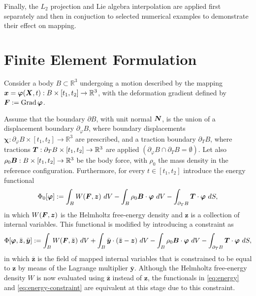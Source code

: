\documentclass[12pt]{article}
\newcommand{\mbs}[1]{\boldsymbol{#1}}
\newcommand{\mbb}[1]{\mathbb{#1}}
\def\by{{\mbs{y}}} \def\bz{{\mbs{z}}}
\def\bvarphi{{\mbs{\varphi}}}
\def\bchi{{\mbs{\chi}}}
\DeclareMathOperator{\Grad}{Grad}
\begin{document}
Finally, the $L_2$ projection and Lie algebra interpolation are applied first
separately and then in conjuction to selected numerical examples to demonstrate
their effect on mapping.


\section{Finite Element Formulation}
\label{sec:FE-formulation}

Consider a body $B\subset\mbb{R}^3$ undergoing a motion described by
the mapping $\bx = \bvarphi(\bX, t): B\times[t_1, t_2]\rightarrow
\mbb{R}^3$, with the deformation gradient defined by $\bF := \Grad
\bvarphi$.

Assume that the boundary $\partial B$, with unit normal $\bN$, is the
union of a displacement boundary $\partial_{\varphi} B$, where
boundary displacements $\bchi : \partial_{\varphi} B\times[t_1,
t_2]\rightarrow \mbb{R}^3$ are prescribed, and a traction boundary
$\partial_T B$, where tractions $\bT: \partial_T B \times[t_1,
t_2]\rightarrow \mbb{R}^3$ are applied $(\partial_{\varphi} B \cap
\partial_T B = \emptyset)$. Let also $\rho_0 \bB: B \times [t_1,
t_2]\rightarrow \mbb{R}^3$ be the body force, with $\rho_0$ the mass
density in the reference configuration.  Furthermore, for every $t \in
[t_1, t_2]$ introduce the energy functional
\begin{equation}\label{eq:energy}
  \Phi_0[ \bvarphi ] :=
  \int_B W(\bF, \bz) \ dV
  -
  \int_B \rho_0 \bB \cdot \bvarphi \ dV
  -
  \int_{\partial_T B} \bT \cdot \bvarphi \ dS,
\end{equation}
in which $W(\bF, \bz)$ is the Helmholtz free-energy density and $\bz$
is a collection of internal variables. This functional is modified by
introducing a constraint as
\begin{equation}\label{eq:energy-constraint}
  \Phi[ \bvarphi, \bar{\bz}, \bar{\by} ] :=
  \int_B W(\bF, \bar{\bz}) \ dV
  +
  \int_B \bar{\by} \cdot (\bar{\bz} - \bz) \ dV
  -
  \int_B \rho_0 \bB \cdot \bvarphi \ dV
  -
  \int_{\partial_T B} \bT \cdot \bvarphi \ dS,
\end{equation}
in which $\bar{\bz}$ is the field of mapped internal variables that is
constrained to be equal to $\bz$ by means of the Lagrange multiplier
$\bar{\by}$. Although the Helmholtz free-energy density $W$ is now
evaluated using $\bar{\bz}$ instead of $\bz$, the functionals in
\eqref{eq:energy} and \eqref{eq:energy-constraint} are equivalent at
this stage due to this constraint.
\end{document}
